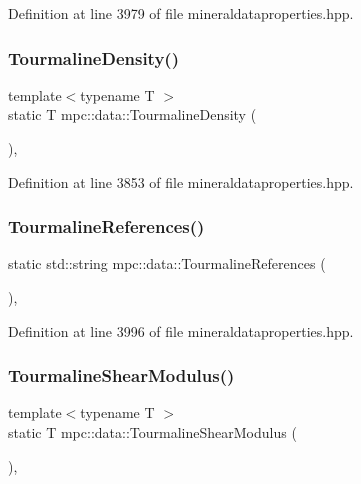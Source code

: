 Definition at line 3979 of file mineraldataproperties.\+hpp.

\mbox{\label{namespacempc_1_1data_a86d92b2c9b6022616b964ae0226f4048}} 
\subsubsection{\texorpdfstring{Tourmaline\+Density()}{TourmalineDensity()}}
{\footnotesize\ttfamily template$<$typename T $>$ \\
static T mpc\+::data\+::\+Tourmaline\+Density (\begin{DoxyParamCaption}{ }\end{DoxyParamCaption})\hspace{0.3cm}{\ttfamily [inline]}, {\ttfamily [static]}}



Definition at line 3853 of file mineraldataproperties.\+hpp.

\mbox{\label{namespacempc_1_1data_afe4d9a1f1fc9e0dd0ad7a31e97b2858a}} 
\subsubsection{\texorpdfstring{Tourmaline\+References()}{TourmalineReferences()}}
{\footnotesize\ttfamily static std\+::string mpc\+::data\+::\+Tourmaline\+References (\begin{DoxyParamCaption}{ }\end{DoxyParamCaption})\hspace{0.3cm}{\ttfamily [inline]}, {\ttfamily [static]}}



Definition at line 3996 of file mineraldataproperties.\+hpp.

\mbox{\label{namespacempc_1_1data_a86dfd4f027c4d52aa385c770751c5e1e}} 
\subsubsection{\texorpdfstring{Tourmaline\+Shear\+Modulus()}{TourmalineShearModulus()}}
{\footnotesize\ttfamily template$<$typename T $>$ \\
static T mpc\+::data\+::\+Tourmaline\+Shear\+Modulus (\begin{DoxyParamCaption}{ }\end{DoxyParamCaption})\hspace{0.3cm}{\ttfamily [inline]}, {\ttfamily [static]}}



